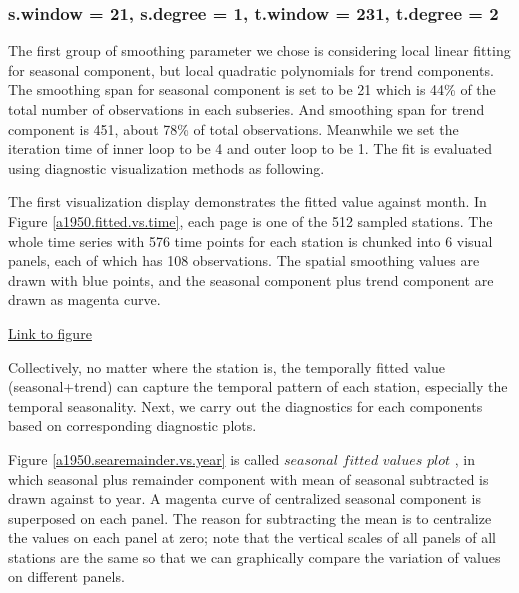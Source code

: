 \subsubsection{s.window = 21, s.degree = 1, t.window = 231, t.degree = 2}
\label{stlplus1}

The first group of smoothing parameter we chose is considering local linear 
fitting for seasonal component, but local quadratic polynomials for trend 
components. The smoothing span for seasonal component is set to be 21 which is 
44\% of the total number of observations in each subseries. And smoothing span 
for trend component is 451, about 78\% of total observations. Meanwhile we set 
the iteration time of inner loop to be 4 and outer loop to be 1. The fit is 
evaluated using diagnostic visualization methods as following. 

The first visualization display demonstrates the fitted value against month. In 
Figure \href{../plots/a1950/stlplus/t231td2_s21sd1_ffd/a1950.stlraw.vs.time.pdf}
{\ref*{a1950.fitted.vs.time}}, each page is one of the 512 sampled stations. The 
whole time series with 576 time points for each station is chunked into 6 visual 
panels, each of which has 108 observations. The spatial smoothing values are drawn 
with blue points, and the seasonal component plus trend component are drawn as
magenta curve.  

\begin{framed}
\begin{center}
  \href{../plots/a1950/stlplus/t231td2_s21sd1_ffd/a1950.stlraw.vs.time.pdf}
  {Link to figure}
  \label{a1950.fitted.vs.time}
\end{center}
\end{framed}

Collectively, no matter where the station is, the temporally fitted value 
(seasonal+trend) can capture the temporal pattern of each station, especially the
temporal seasonality. Next, we carry out the diagnostics for each components 
based on corresponding diagnostic plots.

Figure 
\href{../plots/a1950/stlplus/t231td2_s21sd1_ffd/a1950.searemainder.vs.year.pdf}
{\ref*{a1950.searemainder.vs.year}} is called $seasonal$ $fitted$ $values$ $plot$
\cite{hafen2010local}, in which seasonal plus remainder component with mean of 
seasonal subtracted is drawn against to year. A magenta curve of centralized 
seasonal component is superposed on each panel. The reason for subtracting the 
mean is to centralize the values on each panel at zero; note that the vertical 
scales of all panels of all stations are the same so that we can graphically 
compare the   variation of values on different panels.

